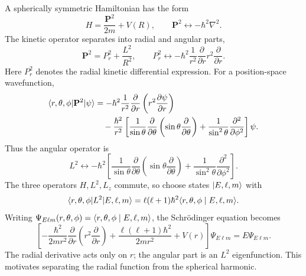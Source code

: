 A spherically symmetric Hamiltonian has the form
\[
 H=\frac{\mathbf P^2}{2m}+V(R),\qquad
 \mathbf P^2\longleftrightarrow-\hbar^2\nabla^2.
\]
The kinetic operator separates into radial and angular parts,
\[
 \mathbf P^2=P_r^2+\frac{L^2}{R^2},\qquad
 P_r^2\longleftrightarrow
 -\hbar^2\frac1{r^2}\frac\partial{\partial r}
       r^2\frac\partial{\partial r}.
\]
Here $P_r^2$ denotes the radial kinetic differential expression.
For a position-space wavefunction,
\begin{align*}
 \langle r,\theta,\phi\rvert \mathbf P^2\lvert \psi\rangle
 &=-\hbar^2\frac1{r^2}\frac\partial{\partial r}
     \left(r^2\frac{\partial\psi}{\partial r}\right)\\
 &\quad-\frac{\hbar^2}{r^2}
   \left[\frac1{\sin\theta}\frac\partial{\partial\theta}
     \left(\sin\theta\frac\partial{\partial\theta}\right)
     +\frac1{\sin^2\theta}\frac{\partial^2}{\partial\phi^2}\right]\psi.
\end{align*}
Thus the angular operator is
\[
 L^2\longleftrightarrow-\hbar^2
 \left[\frac1{\sin\theta}\frac\partial{\partial\theta}
     \left(\sin\theta\frac\partial{\partial\theta}\right)
     +\frac1{\sin^2\theta}\frac{\partial^2}{\partial\phi^2}\right].
\]
The three operators $H,L^2,L_z$ commute, so choose states
$\lvert E,\ell,m\rangle$ with
\[
 \langle r,\theta,\phi\rvert L^2\lvert E,\ell,m\rangle
 =\ell(\ell+1)\hbar^2\langle r,\theta,\phi\mid E,\ell,m\rangle.
\]
Writing $\Psi_{E\ell m}(r,\theta,\phi)
=\langle r,\theta,\phi\mid E,\ell,m\rangle$, the Schr\"odinger equation becomes
\[
 \left[-\frac{\hbar^2}{2m r^2}\frac\partial{\partial r}
       \left(r^2\frac\partial{\partial r}\right)
       +\frac{\ell(\ell+1)\hbar^2}{2mr^2}+V(r)\right]
       \Psi_{E\ell m}=E\Psi_{E\ell m}.
\]
The radial derivative acts only on $r$; the angular part is an
$L^2$ eigenfunction. This motivates separating the radial function from
the spherical harmonic.
